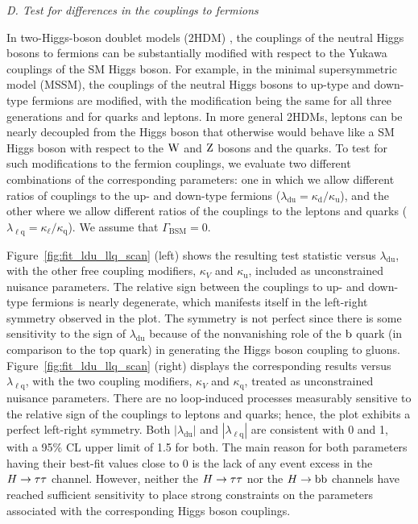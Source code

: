 \documentclass[11pt,twoside,a4paper,cmspaper,final,collab]{cms-tdr}
\begin{document}
\textit{D. Test for differences  in the couplings to fermions}

In  two-Higgs-boson doublet models (2HDM) \cite{Branco:2011iw}, the couplings of the neutral Higgs bosons to fermions
can be substantially modified with respect to the Yukawa couplings of the SM Higgs boson. For example,
in the minimal supersymmetric model (MSSM), the couplings of the neutral Higgs bosons to up-type and down-type fermions are modified,
with the modification being the same for all three generations and for quarks and leptons. In more
general 2HDMs, leptons can be nearly decoupled from the Higgs boson that otherwise would behave
like a SM Higgs boson with respect to the $\mathrm{W}$ and $\mathrm{Z}$ bosons and the quarks.
To test for such modifications to the fermion couplings,
we evaluate two different combinations of the corresponding parameters: one in which we allow
different ratios of couplings to the up- and down-type fermions
($\lambda_{\mathrm{du}} = \kappa_{\mathrm{d}} / \kappa_{\mathrm{u}}$),
and the other where we allow different ratios of the couplings to the leptons and quarks
($\lambda_{\ell\mathrm{q}} = \kappa_{\ell} / \kappa_{\mathrm{q}}$).
We assume that $\Gamma_{\mathrm{BSM}}=0$.

Figure~\ref{fig:fit_ldu_llq_scan} (left) shows the resulting test statistic versus
$\lambda_{\mathrm{du}}$, with the other free coupling modifiers,
$\kappa_V$ and $\kappa_{\mathrm{u}}$, included as
unconstrained nuisance parameters. The relative sign between the couplings to up- and down-type fermions
is nearly degenerate, which manifests itself in the left-right symmetry
observed in the plot. The symmetry is not perfect since there is some sensitivity
to the sign of $\lambda_{\mathrm{du}}$ because of the nonvanishing role
of the $\mathrm{b}$ quark (in comparison to the top quark) in generating the Higgs boson coupling to gluons.
Figure~\ref{fig:fit_ldu_llq_scan} (right) displays the corresponding results versus
$\lambda_{\ell \mathrm{q}}$, with the two coupling modifiers,
$\kappa_V$ and $\kappa_{\mathrm{q}}$,
treated as unconstrained nuisance parameters. There are no loop-induced processes
measurably sensitive to the relative sign of the couplings to leptons and quarks; hence,
the plot exhibits a perfect left-right symmetry.
Both $| \lambda_{\mathrm{du}} |$ and $| \lambda_{\ell \mathrm{q}} |$ are
consistent with 0 and 1, with a 95\% CL upper limit of 1.5 for both.
The main reason for both parameters  having their best-fit values close to 0
is the lack of any event excess in the $H \to \tau\tau$
channel. However, neither the $H \to \tau\tau$
nor the $H \to \mathrm{b}\mathrm{b}$ channels have reached sufficient sensitivity to place strong
constraints on the parameters associated with the corresponding Higgs boson couplings.
\end{document}
